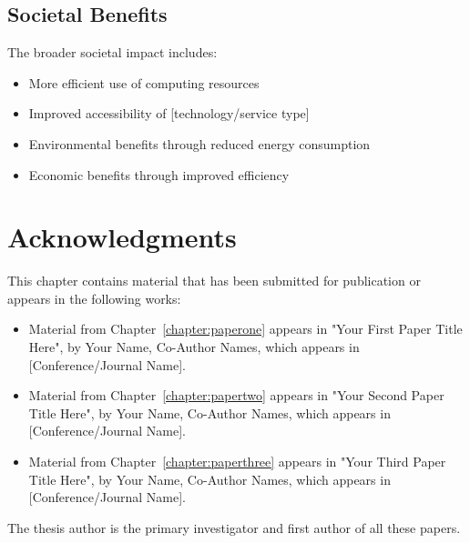 \subsection{Societal Benefits}

The broader societal impact includes:
\begin{itemize}
    \item More efficient use of computing resources
    \item Improved accessibility of [technology/service type]
    \item Environmental benefits through reduced energy consumption
    \item Economic benefits through improved efficiency
\end{itemize}

\section*{Acknowledgments}
This chapter contains material that has been submitted for publication or appears in the following works:

\begin{itemize}
    \item Material from Chapter~\ref{chapter:paperone} appears in "Your First Paper Title Here", by Your Name, Co-Author Names, which appears in [Conference/Journal Name].
    \item Material from Chapter~\ref{chapter:papertwo} appears in "Your Second Paper Title Here", by Your Name, Co-Author Names, which appears in [Conference/Journal Name].
    \item Material from Chapter~\ref{chapter:paperthree} appears in "Your Third Paper Title Here", by Your Name, Co-Author Names, which appears in [Conference/Journal Name].
\end{itemize}

The thesis author is the primary investigator and first author of all these papers.